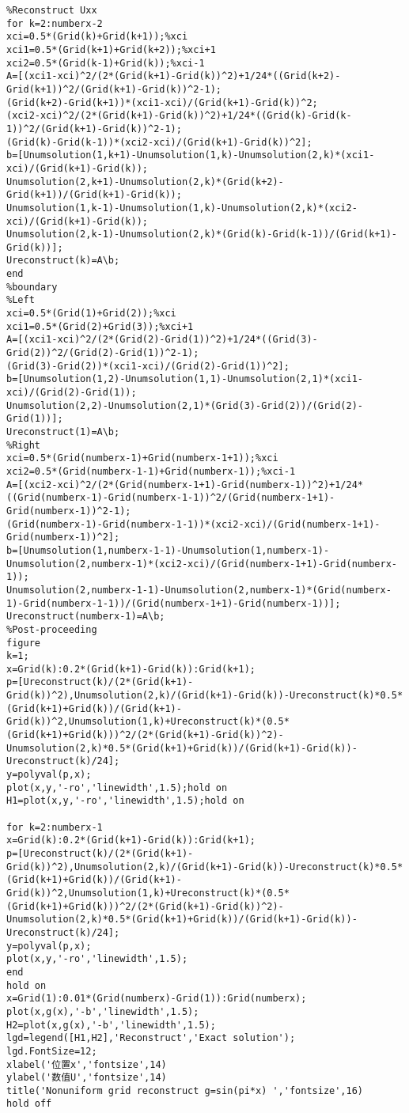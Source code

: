 \documentclass[a4paper,11pt,UTF8]{article}%
\theoremstyle{plain}
\begin{document}
\begin{lstlisting}
%Reconstruct Uxx
for k=2:numberx-2	
xci=0.5*(Grid(k)+Grid(k+1));%xci
xci1=0.5*(Grid(k+1)+Grid(k+2));%xci+1
xci2=0.5*(Grid(k-1)+Grid(k));%xci-1
A=[(xci1-xci)^2/(2*(Grid(k+1)-Grid(k))^2)+1/24*((Grid(k+2)-Grid(k+1))^2/(Grid(k+1)-Grid(k))^2-1);
(Grid(k+2)-Grid(k+1))*(xci1-xci)/(Grid(k+1)-Grid(k))^2;
(xci2-xci)^2/(2*(Grid(k+1)-Grid(k))^2)+1/24*((Grid(k)-Grid(k-1))^2/(Grid(k+1)-Grid(k))^2-1);
(Grid(k)-Grid(k-1))*(xci2-xci)/(Grid(k+1)-Grid(k))^2];
b=[Unumsolution(1,k+1)-Unumsolution(1,k)-Unumsolution(2,k)*(xci1-xci)/(Grid(k+1)-Grid(k));
Unumsolution(2,k+1)-Unumsolution(2,k)*(Grid(k+2)-Grid(k+1))/(Grid(k+1)-Grid(k));
Unumsolution(1,k-1)-Unumsolution(1,k)-Unumsolution(2,k)*(xci2-xci)/(Grid(k+1)-Grid(k));
Unumsolution(2,k-1)-Unumsolution(2,k)*(Grid(k)-Grid(k-1))/(Grid(k+1)-Grid(k))];
Ureconstruct(k)=A\b;
end
%boundary
%Left
xci=0.5*(Grid(1)+Grid(2));%xci
xci1=0.5*(Grid(2)+Grid(3));%xci+1
A=[(xci1-xci)^2/(2*(Grid(2)-Grid(1))^2)+1/24*((Grid(3)-Grid(2))^2/(Grid(2)-Grid(1))^2-1);
(Grid(3)-Grid(2))*(xci1-xci)/(Grid(2)-Grid(1))^2];
b=[Unumsolution(1,2)-Unumsolution(1,1)-Unumsolution(2,1)*(xci1-xci)/(Grid(2)-Grid(1));
Unumsolution(2,2)-Unumsolution(2,1)*(Grid(3)-Grid(2))/(Grid(2)-Grid(1))];    
Ureconstruct(1)=A\b;
%Right    
xci=0.5*(Grid(numberx-1)+Grid(numberx-1+1));%xci
xci2=0.5*(Grid(numberx-1-1)+Grid(numberx-1));%xci-1    
A=[(xci2-xci)^2/(2*(Grid(numberx-1+1)-Grid(numberx-1))^2)+1/24*((Grid(numberx-1)-Grid(numberx-1-1))^2/(Grid(numberx-1+1)-Grid(numberx-1))^2-1);
(Grid(numberx-1)-Grid(numberx-1-1))*(xci2-xci)/(Grid(numberx-1+1)-Grid(numberx-1))^2];
b=[Unumsolution(1,numberx-1-1)-Unumsolution(1,numberx-1)-Unumsolution(2,numberx-1)*(xci2-xci)/(Grid(numberx-1+1)-Grid(numberx-1));
Unumsolution(2,numberx-1-1)-Unumsolution(2,numberx-1)*(Grid(numberx-1)-Grid(numberx-1-1))/(Grid(numberx-1+1)-Grid(numberx-1))];   
Ureconstruct(numberx-1)=A\b;
%Post-proceeding
figure
k=1;
x=Grid(k):0.2*(Grid(k+1)-Grid(k)):Grid(k+1);
p=[Ureconstruct(k)/(2*(Grid(k+1)-Grid(k))^2),Unumsolution(2,k)/(Grid(k+1)-Grid(k))-Ureconstruct(k)*0.5*(Grid(k+1)+Grid(k))/(Grid(k+1)-Grid(k))^2,Unumsolution(1,k)+Ureconstruct(k)*(0.5*(Grid(k+1)+Grid(k)))^2/(2*(Grid(k+1)-Grid(k))^2)-Unumsolution(2,k)*0.5*(Grid(k+1)+Grid(k))/(Grid(k+1)-Grid(k))-Ureconstruct(k)/24];
y=polyval(p,x);
plot(x,y,'-ro','linewidth',1.5);hold on
H1=plot(x,y,'-ro','linewidth',1.5);hold on
		
for k=2:numberx-1
x=Grid(k):0.2*(Grid(k+1)-Grid(k)):Grid(k+1);
p=[Ureconstruct(k)/(2*(Grid(k+1)-Grid(k))^2),Unumsolution(2,k)/(Grid(k+1)-Grid(k))-Ureconstruct(k)*0.5*(Grid(k+1)+Grid(k))/(Grid(k+1)-Grid(k))^2,Unumsolution(1,k)+Ureconstruct(k)*(0.5*(Grid(k+1)+Grid(k)))^2/(2*(Grid(k+1)-Grid(k))^2)-Unumsolution(2,k)*0.5*(Grid(k+1)+Grid(k))/(Grid(k+1)-Grid(k))-Ureconstruct(k)/24];
y=polyval(p,x);
plot(x,y,'-ro','linewidth',1.5);
end
hold on
x=Grid(1):0.01*(Grid(numberx)-Grid(1)):Grid(numberx);
plot(x,g(x),'-b','linewidth',1.5);
H2=plot(x,g(x),'-b','linewidth',1.5);
lgd=legend([H1,H2],'Reconstruct','Exact solution');
lgd.FontSize=12;
xlabel('位置x','fontsize',14)
ylabel('数值U','fontsize',14)
title('Nonuniform grid reconstruct g=sin(pi*x) ','fontsize',16)
hold off
		

\end{lstlisting}
\end{document}
